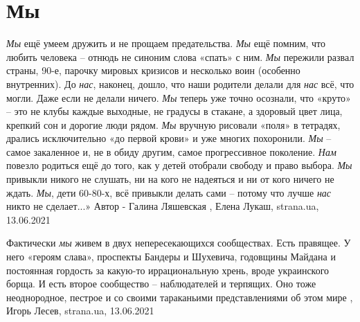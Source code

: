  
 
 
 
 
\chapter{Мы}

\emph{Мы} ещё умеем дружить и не прощаем предательства. \emph{Мы} ещё помним,
что любить человека – отнюдь не синоним слова «спать» с ним. \emph{Мы}
пережили развал страны, 90-е, парочку мировых кризисов и несколько воин
(особенно внутренних).  До \emph{нас}, наконец, дошло, что наши родители делали
для \emph{нас} всё, что могли. Даже если не делали ничего.  \emph{Мы} теперь
уже точно осознали, что «круто» – это не клубы каждые выходные, не градусы в
стакане, а здоровый цвет лица, крепкий сон и дорогие люди рядом.  \emph{Мы}
вручную рисовали «поля» в тетрадях, дрались исключительно «до первой крови» и
уже многих похоронили. \emph{Мы} – самое закаленное и, не в обиду другим, самое
прогрессивное поколение. \emph{Нам} повезло родиться ещё до того, как у детей
отобрали свободу и право выбора. \emph{Мы} привыкли никого не слушать, ни на
кого не надеяться и ни от кого ничего не ждать.  \emph{Мы}, дети 60-80-х, всё
привыкли делать сами – потому что лучше \emph{нас} никто не сделает...» Автор -
Галина Ляшевская
, 
Елена Лукаш, strana.ua, 13.06.2021

Фактически \emph{мы} живем в двух непересекающихся сообществах. Есть правящее. У него
«героям слава», проспекты Бандеры и Шухевича, годовщины Майдана и постоянная
гордость за какую-то иррациональную хрень, вроде украинского борща. И есть
второе сообщество – наблюдателей и терпящих. Оно тоже неоднородное, пестрое и
со своими тараканьими представлениями об этом мире
, 
Игорь Лесев, strana.ua, 13.06.2021

